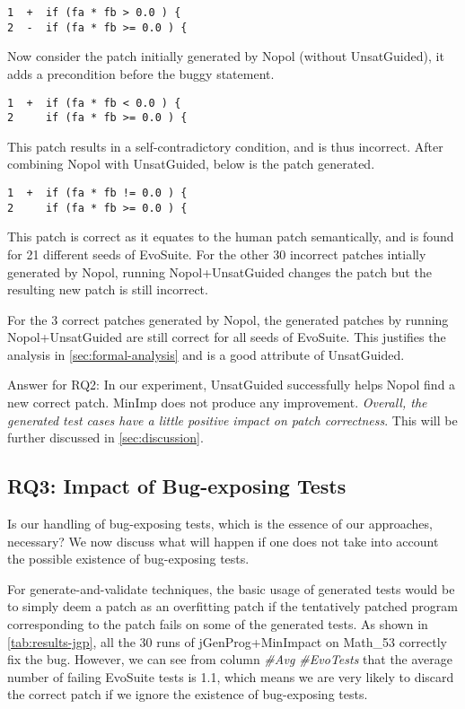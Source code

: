 \documentclass[]{sig-alternate}
\begin{document}
\begin{verbatim}
1  +  if (fa * fb > 0.0 ) {
2  -  if (fa * fb >= 0.0 ) {
\end{verbatim}

Now consider the patch initially generated by Nopol (without UnsatGuided), it adds a precondition before the buggy statement.

\begin{verbatim}
1  +  if (fa * fb < 0.0 ) {
2     if (fa * fb >= 0.0 ) {
\end{verbatim}

This patch results in a self-contradictory condition, and is thus incorrect. After combining Nopol with UnsatGuided, below is the patch generated. 

\begin{verbatim}
1  +  if (fa * fb != 0.0 ) {
2     if (fa * fb >= 0.0 ) {
\end{verbatim}

This patch is correct as it equates to the human patch semantically, and is found for 21 different seeds of EvoSuite.
For the other 30 incorrect patches intially generated by Nopol, running Nopol+UnsatGuided changes the patch but the resulting new patch is still incorrect. 

For the 3 correct patches generated by Nopol, the generated patches by running Nopol+UnsatGuided are still correct for all seeds of EvoSuite. This justifies the analysis in \autoref{sec:formal-analysis} and is a good attribute of UnsatGuided.


Answer for RQ2: In our experiment, UnsatGuided successfully helps Nopol find a new correct patch. MinImp does not produce any improvement. 
\emph{Overall, the generated test cases have a little positive impact on patch correctness}. This will be further discussed in \autoref{sec:discussion}.
  
\vspace{-0.5em}
\subsection{RQ3: Impact of Bug-exposing Tests}

Is our handling of bug-exposing tests, which is the essence of our approaches, necessary?
We now discuss what will happen if one does not take into account the possible existence of bug-exposing tests. 

For generate-and-validate techniques, the basic usage of generated tests would be to simply deem a patch as an overfitting patch if the tentatively patched program corresponding to the patch fails on some of the generated tests. As shown in \autoref{tab:results-jgp}, all the 30 runs of jGenProg+MinImpact on Math\_53 correctly fix the bug. However, we can see from column \emph{\#Avg \#EvoTests} that the average number of failing EvoSuite tests is 1.1, which means we are very likely to discard the correct patch if we ignore the existence of bug-exposing tests.  
\end{document}
